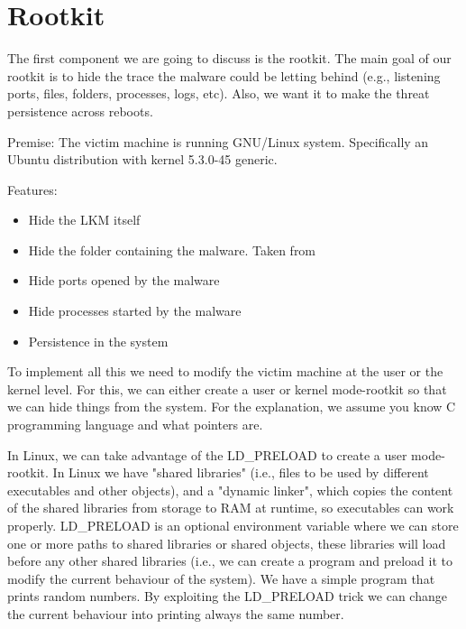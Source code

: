 \documentclass[11pt, a4paper,twoside]{tesi_upf}
\begin{document}
\section{Rootkit}

The first component we are going to discuss is the rootkit. The main goal of our rootkit is to hide the trace the malware could be letting behind (e.g., listening ports, files, folders, processes, logs, etc). Also, we want it to make the threat persistence across reboots.

Premise:
The victim machine is running GNU/Linux system. Specifically an Ubuntu distribution with kernel 5.3.0-45 generic.

Features:
\begin{itemize}
    \item Hide the LKM itself
    \item Hide the folder containing the malware. Taken from \cite{}
    \item Hide ports opened by the malware
    \item Hide processes started by the malware
    \item Persistence in the system
\end{itemize}

To implement all this we need to modify the victim machine at the user or the kernel level. For this, we can either create a user or kernel mode-rootkit so that we can hide things from the system. For the explanation, we assume you know C programming language and what pointers are.

In Linux, we can take advantage of the LD\_PRELOAD to create a user mode-rootkit. In Linux we have "shared libraries" (i.e., files to be used by different executables and other objects), and a "dynamic linker", which copies the content of the shared libraries from storage to RAM at runtime, so executables can work properly. LD\_PRELOAD is an optional environment variable where we can store one or more paths to shared libraries or shared objects, these libraries will load before any other shared libraries (i.e., we can create a program and preload it to modify the current behaviour of the system). We have a simple program that prints random numbers. By exploiting the LD\_PRELOAD trick we can change the current behaviour into printing always the same number.
\end{document}
